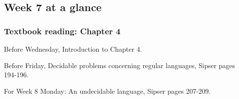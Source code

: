 

\subsection*{Week 7 at a glance}

\subsubsection*{Textbook reading: Chapter 4}

\vspace{-20pt}

Before Wednesday, Introduction to Chapter 4.

Before Friday, Decidable problems concerning regular languages, 
Sipser pages 194-196.

For Week 8 Monday: An undecidable language, Sipser pages 207-209.

\vspace{-20pt}

